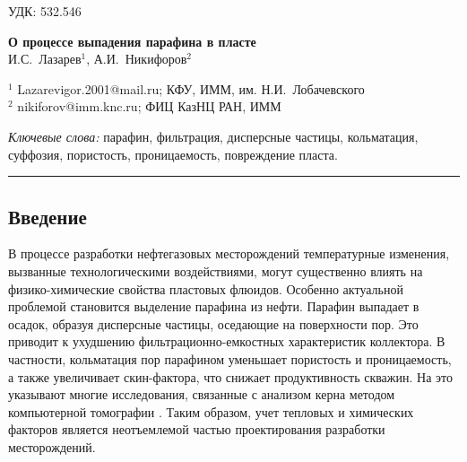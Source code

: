 \documentclass[a4paper,12pt]{article}
\begin{document}
\noindent
УДК: 532.546

{\large
\begin{center}
\textbf{О процессе выпадения парафина в пласте}\\
И.С.~Лазарев$^1$, А.И.~Никифоров$^2$
\end{center}
} 

{\footnotesize
\noindent $^1$ Lazarevigor.2001@mail.ru; КФУ, ИММ, им. Н.И.~Лобачевского \\
\noindent $^2$ nikiforov@imm.knc.ru; ФИЦ КазНЦ РАН, ИММ
}


\begin{abstract}
	В работе рассматривается задача двухфазной неизотермической фильтрации воды и нефти. Нефть моделируется как смесь двух несмешивающихся с водой углеводородных составляющих "нефти" и "парафина". Задача численно решается методом контрольных объемов. Для прогнозирования кристаллизации парафина применяется теория идеального раствора бинарной смеси. Основное внимание уделяется процессам осаждения частиц в пористой среде. Для уравнений, определяющих динамику изменения пористости и проницаемости, используются зависимости, основанные на функции распределения пор по размерам. 
\end{abstract}

\noindent
\textit{Ключевые слова:} парафин, фильтрация, дисперсные частицы, кольматация, суффозия, пористость, проницаемость, повреждение пласта.


\vspace{1em}
\hrule

\vspace{1em}
{\subsection*{\normalsize Введение}}
	В процессе разработки нефтегазовых месторождений температурные изменения, вызванные технологическими воздействиями, могут существенно влиять на физико-химические свойства пластовых флюидов. Особенно актуальной проблемой становится выделение парафина из нефти. Парафин выпадает в осадок, образуя дисперсные частицы, оседающие на поверхности пор. Это приводит к ухудшению фильтрационно-емкостных характеристик коллектора. В частности, кольматация пор парафином уменьшает пористость и проницаемость, а также увеличивает скин-фактора, что снижает продуктивность скважин. На это указывают многие исследования, связанные с анализом керна методом компьютерной томографии \cite{bib:01}. Таким образом, учет тепловых и химических факторов является неотъемлемой частью проектирования разработки месторождений. 
\end{document}
